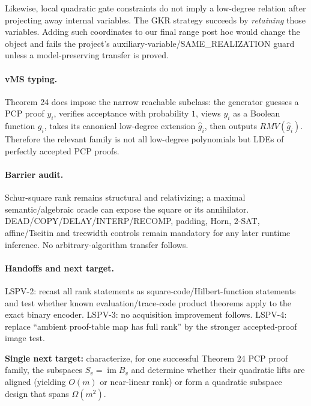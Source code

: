 \documentclass[11pt]{article}
\begin{document}
Likewise, local quadratic gate constraints do not imply a low-degree relation after projecting away internal variables. The GKR strategy succeeds by \emph{retaining} those variables. Adding such coordinates to our final range post hoc would change the object and fails the project's auxiliary-variable/SAME\_REALIZATION guard unless a model-preserving transfer is proved.

\paragraph{vMS typing.}
Theorem 24 does impose the narrow reachable subclass: the generator guesses a PCP proof $y_i$, verifies acceptance with probability $1$, views $y_i$ as a Boolean function $g_i$, takes its canonical low-degree extension $\widehat g_i$, then outputs $RMV(\widehat g_i)$. Therefore the relevant family is not all low-degree polynomials but LDEs of perfectly accepted PCP proofs.

\paragraph{Barrier audit.}
Schur-square rank remains structural and relativizing; a maximal semantic/algebraic oracle can expose the square or its annihilator. DEAD/COPY/DELAY/INTERP/RECOMP, padding, Horn, 2-SAT, affine/Tseitin and treewidth controls remain mandatory for any later runtime inference. No arbitrary-algorithm transfer follows.

\paragraph{Handoffs and next target.}
LSPV-2: recast all rank statements as square-code/Hilbert-function statements and test whether known evaluation/trace-code product theorems apply to the exact binary encoder. LSPV-3: no acquisition improvement follows. LSPV-4: replace ``ambient proof-table map has full rank'' by the stronger accepted-proof image test.

\textbf{Single next target:} characterize, for one successful Theorem 24 PCP proof family, the subspaces $S_v=\operatorname{im}B_v$ and determine whether their quadratic lifts are aligned (yielding $O(m)$ or near-linear rank) or form a quadratic subspace design that spans $\Omega(m^2)$.
\end{document}
